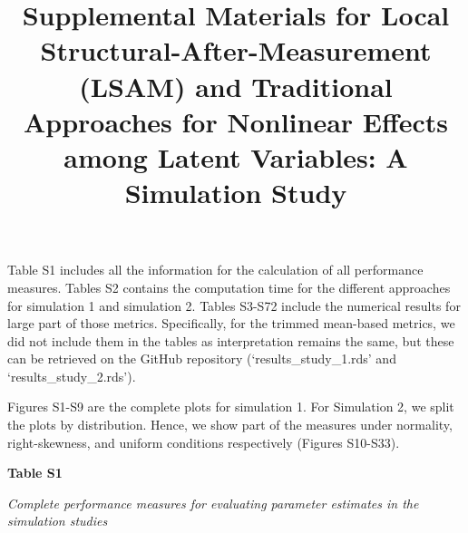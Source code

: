 \documentclass[
  man]{apa7}
\title{Supplemental Materials for Local Structural-After-Measurement (LSAM) and Traditional Approaches for Nonlinear Effects among Latent Variables: A Simulation Study}
\author{\phantom{0}}
\date{}
\affiliation{\phantom{0}}
\begin{document}
\maketitle

Table S1 includes all the information for the calculation of all performance measures. Tables S2 contains the computation time for the different approaches for simulation 1 and simulation 2. Tables S3-S72 include the numerical results for large part of those metrics. Specifically, for the trimmed mean-based metrics, we did not include them in the tables as interpretation remains the same, but these can be retrieved on the GitHub repository (`results\_study\_1.rds' and `results\_study\_2.rds').

Figures S1-S9 are the complete plots for simulation 1. For Simulation 2, we split the plots by distribution. Hence, we show part of the measures under normality, right-skewness, and uniform conditions respectively (Figures S10-S33).

\landscape
\footnotesize
\begin{flushleft}
\textbf{Table S1}

\textit{Complete performance measures for evaluating parameter estimates in the simulation studies}
\end{flushleft}
\end{document}
